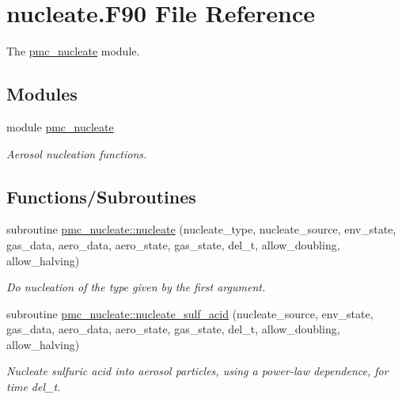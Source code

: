 \hypertarget{nucleate_8_f90}{}\section{nucleate.\+F90 File Reference}
\label{nucleate_8_f90}


The \mbox{\hyperlink{namespacepmc__nucleate}{pmc\+\_\+nucleate}} module.  


\subsection*{Modules}
\begin{DoxyCompactItemize}
\item 
module \mbox{\hyperlink{namespacepmc__nucleate}{pmc\+\_\+nucleate}}
\begin{DoxyCompactList}\small\item\em Aerosol nucleation functions. \end{DoxyCompactList}\end{DoxyCompactItemize}
\subsection*{Functions/\+Subroutines}
\begin{DoxyCompactItemize}
\item 
subroutine \mbox{\hyperlink{namespacepmc__nucleate_ab7689a91cea62cc200e2356b2c201416}{pmc\+\_\+nucleate\+::nucleate}} (nucleate\+\_\+type, nucleate\+\_\+source, env\+\_\+state, gas\+\_\+data, aero\+\_\+data, aero\+\_\+state, gas\+\_\+state, del\+\_\+t, allow\+\_\+doubling, allow\+\_\+halving)
\begin{DoxyCompactList}\small\item\em Do nucleation of the type given by the first argument. \end{DoxyCompactList}\item 
subroutine \mbox{\hyperlink{namespacepmc__nucleate_a417a8f6c4fbc4f588ac915a173b2fda2}{pmc\+\_\+nucleate\+::nucleate\+\_\+sulf\+\_\+acid}} (nucleate\+\_\+source, env\+\_\+state, gas\+\_\+data, aero\+\_\+data, aero\+\_\+state, gas\+\_\+state, del\+\_\+t, allow\+\_\+doubling, allow\+\_\+halving)
\begin{DoxyCompactList}\small\item\em Nucleate sulfuric acid into aerosol particles, using a power-\/law dependence, for time {\ttfamily del\+\_\+t}. \end{DoxyCompactList}\end{DoxyCompactItemize}
